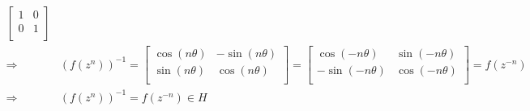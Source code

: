 \documentclass{article}
\begin{document}
\begin{equation*}
\begin{split}
\begin{bmatrix}
            1&0\\
            0&1\\
        \end{bmatrix}\\
        \Rightarrow&(f(z^n))^{-1}=\begin{bmatrix}
            \cos(n\theta)&-\sin(n\theta)\\
            \sin(n\theta)&\cos(n\theta)\\
        \end{bmatrix}=\begin{bmatrix}
            \cos(-n\theta)&\sin(-n\theta)\\
            -\sin(-n\theta)&\cos(-n\theta)\\
        \end{bmatrix}=f(z^{-n})\\
        \Rightarrow&(f(z^n))^{-1}=f(z^{-n})\in H\\
    \end{split}
\end{equation*}
\end{document}
